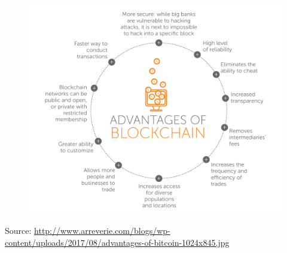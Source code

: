 \documentclass[10pt]{beamer}
\begin{document}
\begin{frame}
	\begin{figure}[]
		\centering
		\includegraphics  [scale=0.15]{Images/advantages}
	\end{figure}
	\begin{tiny}
		Source: \href{http://www.arreverie.com/blogs/blockchain-technology-everything-need-know/advantages-of-bitcoin/}{http://www.arreverie.com/blogs/wp-content/uploads/2017/08/advantages-of-bitcoin-1024x845.jpg}
	\end{tiny}
\end{frame}

\end{document}
